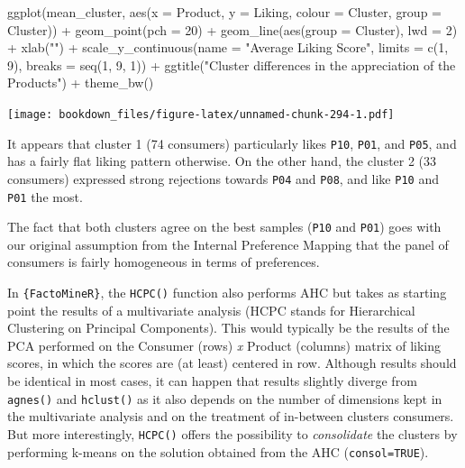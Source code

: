 \documentclass[
]{krantz}
\makeatletter
\newenvironment{Shaded}{\begin{snugshade}}{\end{snugshade}}
\newcommand{\AttributeTok}[1]{\textcolor[rgb]{0.61,0.61,0.61}{#1}}
\newcommand{\DecValTok}[1]{\textcolor[rgb]{0.06,0.06,0.06}{#1}}
\newcommand{\FunctionTok}[1]{\textcolor[rgb]{0,0,0}{#1}}
\newcommand{\NormalTok}[1]{#1}
\newcommand{\SpecialCharTok}[1]{\textcolor[rgb]{0,0,0}{#1}}
\newcommand{\StringTok}[1]{\textcolor[rgb]{0.5,0.5,0.5}{#1}}
\renewenvironment{quote}{\begin{VF}}{\end{VF}}
\newenvironment{kframe}{%
\medskip{}
\setlength{\fboxsep}{.8em}
 \def\at@end@of@kframe{}%
 \ifinner\ifhmode%
  \def\at@end@of@kframe{\end{minipage}}%
  \begin{minipage}{\columnwidth}%
 \fi\fi%
 \def\FrameCommand##1{\hskip\@totalleftmargin \hskip-\fboxsep
 \colorbox{shadecolor}{##1}\hskip-\fboxsep
     \hskip-\linewidth \hskip-\@totalleftmargin \hskip\columnwidth}%
 \MakeFramed {\advance\hsize-\width
   \@totalleftmargin\z@ \linewidth\hsize
   \@setminipage}}%
 {\par\unskip\endMakeFramed%
 \at@end@of@kframe}
\renewenvironment{Shaded}{\begin{kframe}}{\end{kframe}}
\makeatother
\begin{document}
\begin{Shaded}
\begin{Highlighting}[]
\FunctionTok{ggplot}\NormalTok{(mean\_cluster, }\FunctionTok{aes}\NormalTok{(}\AttributeTok{x =}\NormalTok{ Product, }\AttributeTok{y =}\NormalTok{ Liking, }
                         \AttributeTok{colour =}\NormalTok{ Cluster, }\AttributeTok{group =}\NormalTok{ Cluster)) }\SpecialCharTok{+}
  \FunctionTok{geom\_point}\NormalTok{(}\AttributeTok{pch =} \DecValTok{20}\NormalTok{) }\SpecialCharTok{+}
  \FunctionTok{geom\_line}\NormalTok{(}\FunctionTok{aes}\NormalTok{(}\AttributeTok{group =}\NormalTok{ Cluster), }\AttributeTok{lwd =} \DecValTok{2}\NormalTok{) }\SpecialCharTok{+}
  \FunctionTok{xlab}\NormalTok{(}\StringTok{""}\NormalTok{) }\SpecialCharTok{+}
  \FunctionTok{scale\_y\_continuous}\NormalTok{(}\AttributeTok{name =} \StringTok{"Average Liking Score"}\NormalTok{, }
                     \AttributeTok{limits =} \FunctionTok{c}\NormalTok{(}\DecValTok{1}\NormalTok{, }\DecValTok{9}\NormalTok{), }\AttributeTok{breaks =} \FunctionTok{seq}\NormalTok{(}\DecValTok{1}\NormalTok{, }\DecValTok{9}\NormalTok{, }\DecValTok{1}\NormalTok{)) }\SpecialCharTok{+}
  \FunctionTok{ggtitle}\NormalTok{(}\StringTok{"Cluster differences in the appreciation of the Products"}\NormalTok{) }\SpecialCharTok{+}
  \FunctionTok{theme\_bw}\NormalTok{()}
\end{Highlighting}
\end{Shaded}

\texttt{[image: bookdown\_files/figure-latex/unnamed-chunk-294-1.pdf]}

It appears that cluster 1 (74 consumers) particularly likes \texttt{P10}, \texttt{P01}, and \texttt{P05}, and has a fairly flat liking pattern otherwise. On the other hand, the cluster 2 (33 consumers) expressed strong rejections towards \texttt{P04} and \texttt{P08}, and like \texttt{P10} and \texttt{P01} the most.

The fact that both clusters agree on the best samples (\texttt{P10} and \texttt{P01}) goes with our original assumption from the Internal Preference Mapping that the panel of consumers is fairly homogeneous in terms of preferences.

\begin{quote}
In \texttt{\{FactoMineR\}}, the \texttt{HCPC()} function also performs AHC but takes as starting point the results of a multivariate analysis (HCPC stands for Hierarchical Clustering on Principal Components). This would typically be the results of the PCA performed on the Consumer (rows) \emph{x} Product (columns) matrix of liking scores, in which the scores are (at least) centered in row.
Although results should be identical in most cases, it can happen that results slightly diverge from \texttt{agnes()} and \texttt{hclust()} as it also depends on the number of dimensions kept in the multivariate analysis and on the treatment of in-between clusters consumers. But more interestingly, \texttt{HCPC()} offers the possibility to \emph{consolidate} the clusters by performing k-means on the solution obtained from the AHC (\texttt{consol=TRUE}).
\end{quote}
\end{document}
